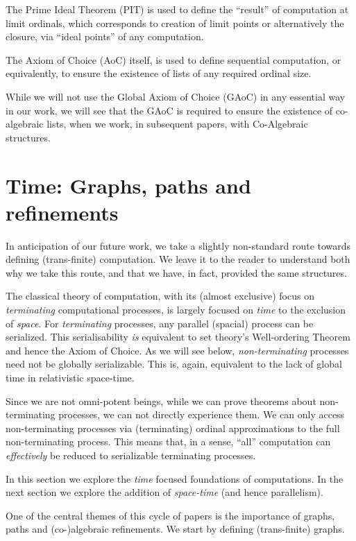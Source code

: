\documentclass[a4paper]{amsart}
\begin{document}
The Prime Ideal Theorem (PIT) is used to define the ``result'' of computation at
limit ordinals, which corresponds to creation of limit points or alternatively
the closure, via ``ideal points'' of any computation.

The Axiom of Choice (AoC) itself, is used to define sequential computation, or
equivalently, to ensure the existence of lists of any required ordinal size.

While we will not use the Global Axiom of Choice (GAoC) in any essential way in
our work, we will see that the GAoC is required to ensure the existence of
co-algebraic lists, when we work, in subsequent papers, with Co-Algebraic
structures.

\section{Time: Graphs, paths and refinements}

In anticipation of our future work, we take a slightly non-standard route towards defining
(trans-finite) computation. We leave it to the reader to understand both why we take
this route, and that we have, in fact, provided the same structures.

The classical theory of computation, with its (almost exclusive) focus on
\emph{terminating} computational processes, is largely focused on \emph{time} to the
exclusion of \emph{space}. For \emph{terminating} processes, any parallel (spacial)
process can be serialized. This serialisability \emph{is} equivalent to set theory's
Well-ordering Theorem and hence the Axiom of Choice. As we will see below,
\emph{non-terminating} processes need not be globally serializable. This is, again,
equivalent to the lack of global time in relativistic space-time.

Since we are not omni-potent beings, while we can prove theorems about non-terminating 
processes, we can not directly experience them. We can only access non-terminating processes 
via (terminating) ordinal approximations to the full non-terminating process. This means 
that, in a sense, ``all'' computation can \emph{effectively} be reduced to serializable 
terminating processes. 

In this section we explore the \emph{time} focused foundations of computations. In the next 
section we explore the addition of \emph{space-time} (and hence parallelism).

One of the central themes of this cycle of papers is the importance of graphs, paths and
(co-)algebraic refinements. We start by defining (trans-finite) graphs.
\end{document}
